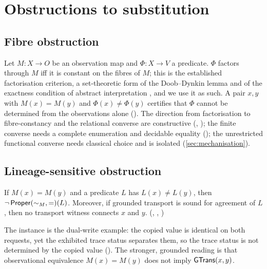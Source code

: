 \section{Obstructions to substitution}\label{sec:obstruction}

\subsection{Fibre obstruction}
Let $M : X \to O$ be an observation map and $\Phi : X \to V$ a predicate. $\Phi$ factors through $M$ iff it is constant on the fibres of $M$; this is the established factorisation criterion, a set-theoretic form of the Doob--Dynkin lemma and of the exactness condition of abstract interpretation \cite{cousot1977}, and we use it as such. A pair $x,y$ with $M(x) = M(y)$ and $\Phi(x) \neq \Phi(y)$ certifies that $\Phi$ cannot be determined from the observations alone (). The direction from factorisation to fibre-constancy and the relational converse are constructive (, ); the finite converse needs a complete enumeration and decidable equality (); the unrestricted functional converse needs classical choice and is isolated (\cref{sec:mechanisation}).

\subsection{Lineage-sensitive obstruction}
\begin{theorem}\label{thm:lineage-obs}
If $M(x) = M(y)$ and a predicate $L$ has $L(x) \neq L(y)$, then $\neg\,\mathsf{Proper}(\sim_M, =)(L)$. Moreover, if grounded transport is sound for agreement of $L$, then no transport witness connects $x$ and $y$. (, , )
\end{theorem}
The instance is the dual-write example: the copied value is identical on both requests, yet the exhibited trace status separates them, so the trace status is not determined by the copied value (). The stronger, grounded reading is that observational equivalence $M(x) = M(y)$ does not imply $\mathsf{GTrans}(x,y)$.

